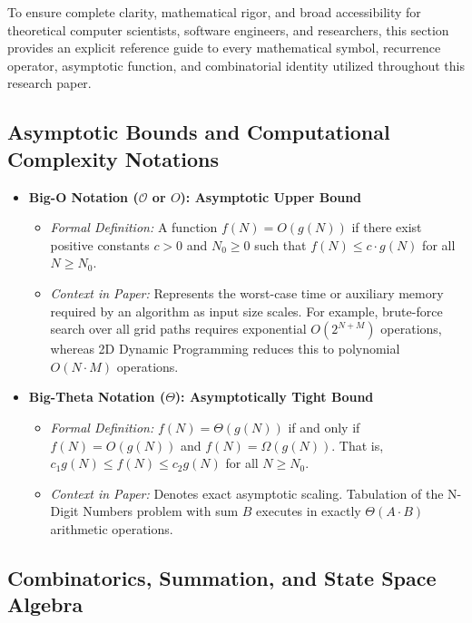 \documentclass[10pt,journal,compsoc,onecolumn]{IEEEtran}
\begin{document}
To ensure complete clarity, mathematical rigor, and broad accessibility for theoretical computer scientists, software engineers, and researchers, this section provides an explicit reference guide to every mathematical symbol, recurrence operator, asymptotic function, and combinatorial identity utilized throughout this research paper.

\subsection{Asymptotic Bounds and Computational Complexity Notations}

\begin{itemize}
    \item \textbf{Big-O Notation ($\mathcal{O}$ or $O$): Asymptotic Upper Bound}
    \begin{itemize}
        \item \emph{Formal Definition:} A function $f(N) = O(g(N))$ if there exist positive constants $c > 0$ and $N_0 \ge 0$ such that $f(N) \le c \cdot g(N)$ for all $N \ge N_0$.
        \item \emph{Context in Paper:} Represents the worst-case time or auxiliary memory required by an algorithm as input size scales. For example, brute-force search over all grid paths requires exponential $O(2^{N+M})$ operations, whereas 2D Dynamic Programming reduces this to polynomial $O(N \cdot M)$ operations.
    \end{itemize}

    \item \textbf{Big-Theta Notation ($\Theta$): Asymptotically Tight Bound}
    \begin{itemize}
        \item \emph{Formal Definition:} $f(N) = \Theta(g(N))$ if and only if $f(N) = O(g(N))$ and $f(N) = \Omega(g(N))$. That is, $c_1 g(N) \le f(N) \le c_2 g(N)$ for all $N \ge N_0$.
        \item \emph{Context in Paper:} Denotes exact asymptotic scaling. Tabulation of the N-Digit Numbers problem with sum $B$ executes in exactly $\Theta(A \cdot B)$ arithmetic operations.
    \end{itemize}
\end{itemize}

\subsection{Combinatorics, Summation, and State Space Algebra}
\end{document}
